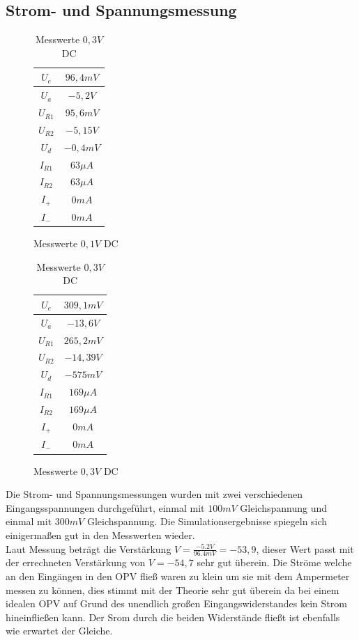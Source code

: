 \subsection{Strom- und Spannungsmessung}
\begin{table}[H]
\begin{minipage}{.5\textwidth}
\begin{figure}[H]
\centering
 \begin{tabular}{c|c}
  $U_e$ & $96,4mV$ \\ \hline
  $U_a$ & $-5,2V$ \\ \hline
  $U_{R1}$ & $95,6mV$ \\ \hline
  $U_{R2}$ & $-5,15V$ \\ \hline
  $U_d$ & $-0,4mV$ \\ \hline
  $I_{R1}$ & $63\mu A$ \\ \hline
  $I_{R2}$ & $63\mu A$ \\ \hline
  $I_+$ & $0mA$ \\ \hline
  $I_-$ & $0mA$ \\
 \end{tabular}
  \caption{Messwerte $0,1V$ DC}
\end{figure}
\end{minipage}
\begin{minipage}{.5\textwidth}
\begin{figure}[H]
  \centering
 \begin{tabular}{c|c}
  $U_e$ & $309,1mV$ \\ \hline
  $U_a$ & $-13,6V$ \\ \hline
  $U_{R1}$ & $265,2mV$ \\ \hline
  $U_{R2}$ & $-14,39V$ \\ \hline
  $U_d$ & $-575mV$ \\ \hline
  $I_{R1}$ & $169\mu A$ \\ \hline
  $I_{R2}$ & $169\mu A$ \\ \hline
  $I_+$ & $0mA$ \\ \hline
  $I_-$ & $0mA$ \\
 \end{tabular}
 \caption{Messwerte $0,3V$ DC}
\end{figure}
\end{minipage}
\end{table}
\noindent
Die Strom- und Spannungsmessungen wurden mit zwei verschiedenen Eingangsspannungen durchgef\"uhrt, einmal mit $100mV$ Gleichspannung und einmal mit $300mV$ Gleichspannung. Die Simulationsergebnisse spiegeln sich einigerma\ss{}en gut in den Messwerten wieder. \\
Laut Messung beträgt die Verstärkung $V=\frac{-5.2V}{96.4mV}=-53,9$, dieser Wert passt mit der errechneten Verst\"arkung von $V=-54,7$ sehr gut \"uberein. Die Str\"ome welche an den Eing\"angen in den OPV flie\ss{} waren zu klein um sie mit dem Ampermeter messen zu k\"onnen, dies stimmt mit der Theorie sehr gut \"uberein da bei einem idealen OPV auf Grund des unendlich großen Eingangswiderstandes kein Strom hineinflie\ss{}en kann. Der Srom durch die beiden Widerst\"ande fließt ist ebenfalls wie erwartet der Gleiche.

